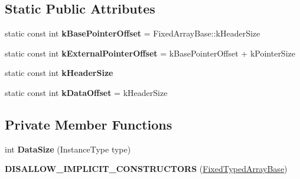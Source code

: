 \subsection*{Static Public Attributes}
\begin{DoxyCompactItemize}
\item 
static const int {\bfseries k\+Base\+Pointer\+Offset} = Fixed\+Array\+Base\+::k\+Header\+Size\hypertarget{classv8_1_1internal_1_1_fixed_typed_array_base_a55b64d60da2005575aee5ed0b3c19f90}{}\label{classv8_1_1internal_1_1_fixed_typed_array_base_a55b64d60da2005575aee5ed0b3c19f90}

\item 
static const int {\bfseries k\+External\+Pointer\+Offset} = k\+Base\+Pointer\+Offset + k\+Pointer\+Size\hypertarget{classv8_1_1internal_1_1_fixed_typed_array_base_a2bc6b1935c40856f64dba93829a48b08}{}\label{classv8_1_1internal_1_1_fixed_typed_array_base_a2bc6b1935c40856f64dba93829a48b08}

\item 
static const int {\bfseries k\+Header\+Size}
\item 
static const int {\bfseries k\+Data\+Offset} = k\+Header\+Size\hypertarget{classv8_1_1internal_1_1_fixed_typed_array_base_a5fd5c68af6f41a1e5659e0523b2b9444}{}\label{classv8_1_1internal_1_1_fixed_typed_array_base_a5fd5c68af6f41a1e5659e0523b2b9444}

\end{DoxyCompactItemize}
\subsection*{Private Member Functions}
\begin{DoxyCompactItemize}
\item 
int {\bfseries Data\+Size} (Instance\+Type type)\hypertarget{classv8_1_1internal_1_1_fixed_typed_array_base_ae297405dadd404b9999de42c076f36f1}{}\label{classv8_1_1internal_1_1_fixed_typed_array_base_ae297405dadd404b9999de42c076f36f1}

\item 
{\bfseries D\+I\+S\+A\+L\+L\+O\+W\+\_\+\+I\+M\+P\+L\+I\+C\+I\+T\+\_\+\+C\+O\+N\+S\+T\+R\+U\+C\+T\+O\+RS} (\hyperlink{classv8_1_1internal_1_1_fixed_typed_array_base}{Fixed\+Typed\+Array\+Base})\hypertarget{classv8_1_1internal_1_1_fixed_typed_array_base_a2ab13341926b072733076f4688951123}{}\label{classv8_1_1internal_1_1_fixed_typed_array_base_a2ab13341926b072733076f4688951123}

\end{DoxyCompactItemize}

